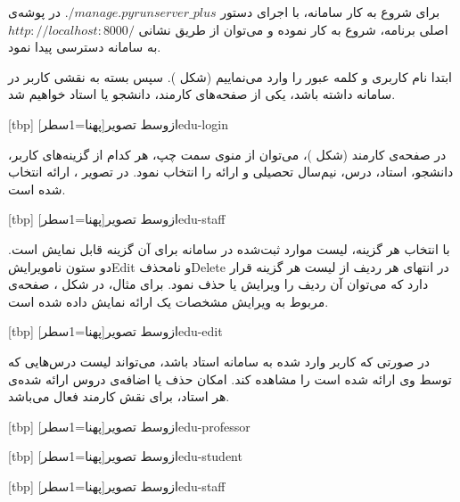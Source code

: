 
برای شروع به کار سامانه، با اجرای دستور $./manage.py runserver\_plus$
در پوشه‌ی اصلی برنامه،  شروع به کار نموده و می‌توان از طریق
نشانی $http://localhost:8000/$ به   سامانه دسترسی پیدا
نمود.

ابتدا نام کاربری و کلمه عبور را وارد می‌نماییم (شکل
). سپس بسته به نقشی کاربر در سامانه داشته باشد،
یکی از صفحه‌های کارمند، دانشجو یا استاد خواهیم شد.

[tbp]
‌ازوسط
‌تصویر[پهنا=1‌سطر]{edu-login}

در صفحه‌ی کارمند (شکل )، می‌توان از منوی سمت چپ، هر
کدام از گزینه‌های کاربر، دانشجو، استاد، درس، نیم‌سال تحصیلی و ارائه را
انتخاب نمود. در تصویر ، ارائه انتخاب شده است.

[tbp]
‌ازوسط
‌تصویر[پهنا=1‌سطر]{edu-staff}

با انتخاب هر گزینه، لیست موارد ثبت‌شده در سامانه برای آن گزینه قابل
نمایش است. دو ستون نام{ویرایش}{Edit} و نام{حذف}{Delete} در انتهای هر
ردیف از لیست هر گزینه قرار دارد که می‌توان آن ردیف را ویرایش یا حذف
نمود. برای مثال، در شکل ، صفحه‌ی مربوط به ویرایش
مشخصات یک ارائه نمایش داده شده است.

[tbp]
‌ازوسط
‌تصویر[پهنا=1‌سطر]{edu-edit}

در صورتی که کاربر وارد شده به سامانه استاد باشد، می‌تواند لیست درس‌هایی
که توسط وی ارائه شده است را مشاهده کند. امکان حذف یا اضافه‌ی دروس ارائه
شده‌ی هر استاد، برای نقش کارمند فعال می‌باشد.

[tbp]
‌ازوسط
‌تصویر[پهنا=1‌سطر]{edu-professor}

[tbp]
‌ازوسط
‌تصویر[پهنا=1‌سطر]{edu-student}

[tbp]
‌ازوسط
‌تصویر[پهنا=1‌سطر]{edu-staff}


                                                                    




